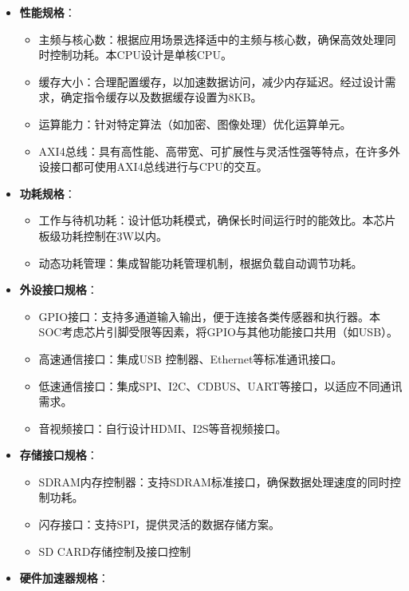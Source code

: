 \begin{itemize}
\tightlist
\item
  \textbf{性能规格}：

  \begin{itemize}
  \tightlist
  \item
    主频与核心数：根据应用场景选择适中的主频与核心数，确保高效处理同时控制功耗。本CPU设计是单核CPU。
  \item
    缓存大小：合理配置缓存，以加速数据访问，减少内存延迟。经过设计需求，确定指令缓存以及数据缓存设置为8KB。
  \item
    运算能力：针对特定算法（如加密、图像处理）优化运算单元。
  \item
    AXI4总线：具有高性能、高带宽、可扩展性与灵活性强等特点，在许多外设接口都可使用AXI4总线进行与CPU的交互。
  \end{itemize}
\item
  \textbf{功耗规格}：

  \begin{itemize}
  \tightlist
  \item
    工作与待机功耗：设计低功耗模式，确保长时间运行时的能效比。本芯片板级功耗控制在3W以内。
  \item
    动态功耗管理：集成智能功耗管理机制，根据负载自动调节功耗。
  \end{itemize}
\item
  \textbf{外设接口规格}：

  \begin{itemize}
  \tightlist
  \item
    GPIO接口：支持多通道输入输出，便于连接各类传感器和执行器。本SOC考虑芯片引脚受限等因素，将GPIO与其他功能接口共用（如USB）。
  \item
    高速通信接口：集成USB 控制器、Ethernet等标准通讯接口。
  \item
    低速通信接口：集成SPI、I2C、CDBUS、UART等接口，以适应不同通讯需求。
  \item
    音视频接口：自行设计HDMI、I2S等音视频接口。
  \end{itemize}
\item
  \textbf{存储接口规格}：

  \begin{itemize}
  \tightlist
  \item
    SDRAM内存控制器：支持SDRAM标准接口，确保数据处理速度的同时控制功耗。
  \item
    闪存接口：支持SPI，提供灵活的数据存储方案。
  \item
    SD CARD存储控制及接口控制
  \end{itemize}
\item
  \textbf{硬件加速器规格}：


\end{itemize}
